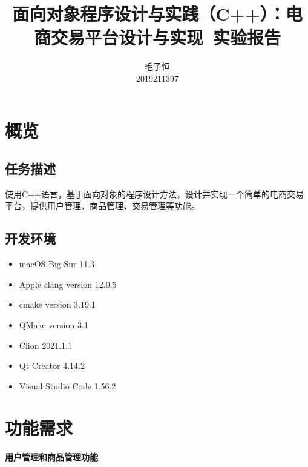 \documentclass[lang=cn,11pt,a4paper,cite=authornum]{paper}
\title{面向对象程序设计与实践（C++）：电商交易平台设计与实现\ 实验报告}
\author{毛子恒 \\ 2019211397}
\institute{北京邮电大学\ 计算机学院}
\date{\zhtoday}
\begin{document}
\maketitle

\section{概览}

\subsection{任务描述}

使用C++语言，基于面向对象的程序设计方法，设计并实现一个简单的电商交易平台，提供用户管理、商品管理、交易管理等功能。

\subsection{开发环境}

\begin{itemize}
    \item macOS Big Sur 11.3
    \item Apple clang version 12.0.5
    \item cmake version 3.19.1
    \item QMake version 3.1
    \item Clion 2021.1.1
    \item Qt Creator 4.14.2
    \item Visual Studio Code 1.56.2
\end{itemize}

\section{功能需求}

\paragraph{用户管理和商品管理功能}
\end{document}

